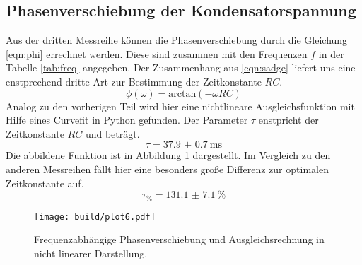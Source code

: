\subsection{Phasenverschiebung der Kondensatorspannung}
Aus der dritten Messreihe können die Phasenverschiebung durch die Gleichung \eqref{eqn:phi} errechnet werden. Diese sind zusammen
mit den Frequenzen $f$ in der Tabelle \ref{tab:freq} angegeben.
Der Zusammenhang aus \eqref{eqn:sadge} liefert uns eine enstprechend dritte Art zur Bestimmung der Zeitkonstante $RC$.
\begin{equation}
    \phi(\omega) = \text{arctan}(-\omega RC)
\end{equation}
Analog zu den vorherigen Teil wird hier eine nichtlineare Ausgleichsfunktion mit Hilfe eines Curvefit in Python gefunden.
Der Parameter $\tau$ enstpricht der Zeitkonstante $RC$ und beträgt.
\begin{equation}
    \label{eqn:bäääh}
    \tau = \SI{37.9(07)}{\ms}
\end{equation}
Die abbildene Funktion ist in Abbildung \ref{fig:plttausend} dargestellt. Im Vergleich zu den anderen Messreihen fällt hier eine besonders
große Differenz zur optimalen Zeitkonstante auf.
\begin{equation*}
    \label{eqn:Mp1kompletterMuell}
    \tau_{\si{\percent}} = \SI{131.1(71)}{\percent}
\end{equation*}
\begin{figure}
    \centering 
    \texttt{[image: build/plot6.pdf]}
    \caption{Frequenzabhängige Phasenverschiebung und Ausgleichsrechnung in nicht linearer Darstellung.}
    \label{fig:plttausend}
\end{figure} 

